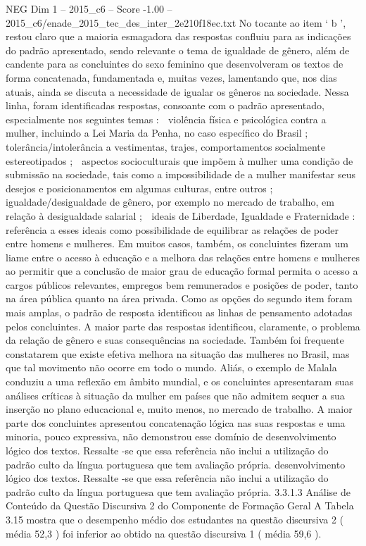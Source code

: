 \begin{textsample}{NEG Dim 1 – 2015\_c6 – Score -1.00 – 2015\_c6/enade\_2015\_tec\_des\_inter\_2e210f18ec.txt}
No tocante ao item ‘ b ’, restou claro que a maioria esmagadora das respostas confluiu para as indicações do padrão apresentado, sendo relevante o tema de igualdade de gênero, além de candente para as concluintes do sexo feminino que desenvolveram os textos de forma concatenada, fundamentada e, muitas vezes, lamentando que, nos dias atuais, ainda se discuta a necessidade de igualar os gêneros na sociedade.
Nessa linha, foram identificadas respostas, consoante com o padrão apresentado, especialmente nos seguintes temas :  violência física e psicológica contra a mulher, incluindo a Lei Maria da Penha, no caso específico do Brasil ;  tolerância/intolerância a vestimentas, trajes, comportamentos socialmente estereotipados ;  aspectos socioculturais que impõem à mulher uma condição de submissão na sociedade, tais como a impossibilidade de a mulher manifestar seus desejos e posicionamentos em algumas culturas, entre outros ;  igualdade/desigualdade de gênero, por exemplo no mercado de trabalho, em relação à desigualdade salarial ;  ideais de Liberdade, Igualdade e Fraternidade : referência a esses ideais como possibilidade de equilibrar as relações de poder entre homens e mulheres.
Em muitos casos, também, os concluintes fizeram um liame entre o acesso à educação e a melhora das relações entre homens e mulheres ao permitir que a conclusão de maior grau de educação formal permita o acesso a cargos públicos relevantes, empregos bem remunerados e posições de poder, tanto na área pública quanto na área privada.
Como as opções do segundo item foram mais amplas, o padrão de resposta identificou as linhas de pensamento adotadas pelos concluintes.
A maior parte das respostas identificou, claramente, o problema da relação de gênero e suas consequências na sociedade.
Também foi frequente constatarem que existe efetiva melhora na situação das mulheres no Brasil, mas que tal movimento não ocorre em todo o mundo.
Aliás, o exemplo de Malala conduziu a uma reflexão em âmbito mundial, e os concluintes apresentaram suas análises críticas à situação da mulher em países que não admitem sequer a sua inserção no plano educacional e, muito menos, no mercado de trabalho.
A maior parte dos concluintes apresentou concatenação lógica nas suas respostas e uma minoria, pouco expressiva, não demonstrou esse domínio de desenvolvimento lógico dos textos.
Ressalte -se que essa referência não inclui a utilização do padrão culto da língua portuguesa que tem avaliação própria. desenvolvimento lógico dos textos.
Ressalte -se que essa referência não inclui a utilização do padrão culto da língua portuguesa que tem avaliação própria. 3.3.1.3 Análise de Conteúdo da Questão Discursiva 2 do Componente de Formação Geral A Tabela 3.15 mostra que o desempenho médio dos estudantes na questão discursiva 2 ( média 52,3 ) foi inferior ao obtido na questão discursiva 1 ( média 59,6 ).

\end{textsample}
